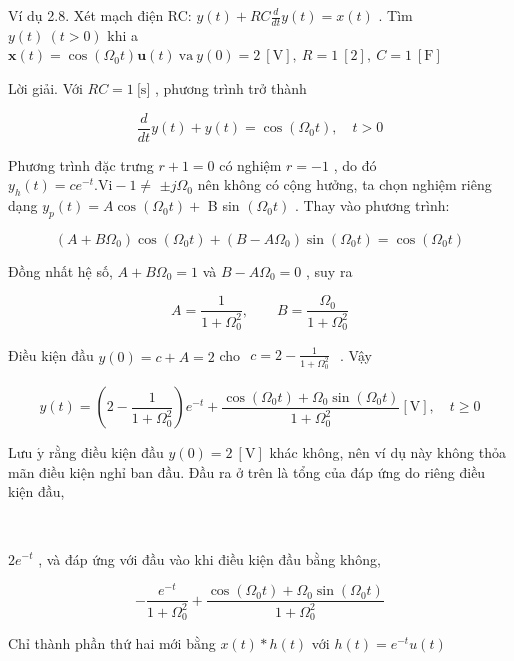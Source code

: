 \documentclass[
  10
]{article}
\begin{document}
Ví dụ 2.8. Xét mạch điện RC:
\(y ( t ) + R C { \frac { d } { d t } } y ( t ) = x ( t )\) . Tìm
\(y ( t ) \ ( t > 0 )\) khi a
\({ \boldsymbol { x } } ( t ) = \cos ( { \Omega _ { 0 } t } ) { \boldsymbol { u } } ( t ) \ \mathrm { v a } \ y ( 0 ) = 2 \ \mathrm { [ V ] } , \ R = 1 \ \mathrm { [ 2 ] } , \ C = 1 \ \mathrm { [ F ] }\)

Lời giải. Với \(R C = 1 ~ [ \mathrm { s ] }\) , phương trình trở thành

\[
\frac {d}{d t} y (t) + y (t) = \cos (\Omega_ {0} t), \quad t > 0
\]

Phương trình đặc trưng \(r + 1 = 0\) có nghiệm \(r = - 1\) , do đó
\(y _ { h } ( t ) = c e ^ { - t } . \mathrm { V i } - 1 \neq\)
\(\pm j \Omega _ { 0 }\) nên không có cộng hưởng, ta chọn nghiệm riêng
dạng \(y _ { p } ( t ) = A \cos ( \Omega _ { 0 } t ) +\) B sin
\(( \Omega _ { 0 } t )\) . Thay vào phương trình:

\[
\left(A + B \Omega_ {0}\right) \cos (\Omega_ {0} t) + \left(B - A \Omega_ {0}\right) \sin (\Omega_ {0} t) = \cos (\Omega_ {0} t)
\]

Đồng nhất hệ số, \(A + B \Omega _ { 0 } = 1\) và
\(B - A \Omega _ { 0 } = 0\) , suy ra

\[
A = \frac {1}{1 + \Omega_ {0} ^ {2}}, \qquad B = \frac {\Omega_ {0}}{1 + \Omega_ {0} ^ {2}}
\]

Điều kiện đầu \(y ( 0 ) = c + A = 2\) cho
\(\begin{array} { r } { c = 2 - \frac { 1 } { 1 + \Omega _ { 0 } ^ { 2 } } } \end{array}\)
. Vậy

\[
y (t) = \left(2 - \frac {1}{1 + \Omega_ {0} ^ {2}}\right) e ^ {- t} + \frac {\cos (\Omega_ {0} t) + \Omega_ {0} \sin (\Omega_ {0} t)}{1 + \Omega_ {0} ^ {2}} [ \mathrm{V} ], \quad t \geq 0
\]

Lưu \(\acute { \mathrm { y } }\) rằng điều kiện đầu
\(y ( 0 ) = 2 \ [ \mathrm { V } ]\) khác không, nên ví dụ này không thỏa
mãn điều kiện nghỉ ban đầu. Đầu ra ở trên là tổng của đáp ứng do riêng
điều kiện đầu,



\(2 e ^ { - t }\) , và đáp ứng với đầu vào khi điều kiện đầu bằng không,

\[
- \frac {e ^ {- t}}{1 + \Omega_ {0} ^ {2}} + \frac {\cos (\Omega_ {0} t) + \Omega_ {0} \sin (\Omega_ {0} t)}{1 + \Omega_ {0} ^ {2}}
\]

Chỉ thành phần thứ hai mới bằng \(x ( t ) * h ( t )\) với
\(h ( t ) = e ^ { - t } u ( t )\)
\end{document}
